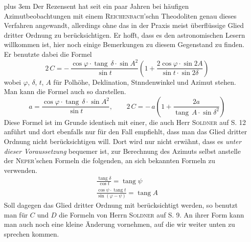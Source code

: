 \begingroup\rightskip=0pt plus 3em
Der Rezensent hat seit ein paar Jahren bei häufigen Azimutbeobachtungen mit einem \textsc{Reichenbach}'schn Theodoliten genau dieses Verfahren angewandt, allerdings ohne das in der Praxis meist überflüssige Glied dritter Ordnung zu berücksichtigen. Er hofft, dass es den astronomischen Lesern willkommen ist, hier noch einige Bemerkungen zu diesem Gegenstand zu finden. Er benutzte dabei die Formel
\[
2\,C = -\,\frac{\cos\varphi\cdot \operatorname{tang}\,\delta\cdot \sin A^2}{\sin t}
\left(1 + \frac{2\cos\varphi\cdot \sin 2A}{\sin t\cdot \sin 2\delta}\right)
\]
wobei $\varphi$, $\delta$, $t$, $A$ für Polhöhe, Deklination, Stnndenwinkel und Azimut stehen. Man kann die Formel auch so darstellen.
\[
a = \frac{\cos\varphi\cdot \operatorname{tang}\,\delta\cdot \sin A^2}{\sin t}, \qquad
2\,C = -\,a\left(1 + \frac{2a}{\operatorname{tang}\,A\cdot \sin\delta^2}\right)
\]
Diese Formel ist im Grunde identisch mit einer, die auch Herr \textsc{Soldner} auf S. 12 anführt und dort ebenfalls nur für den Fall empfiehlt, dass man das Glied dritter Ordnung nicht berücksichtigen will. Dort wird nur nicht erwähnt, dass es \emph{unter dieser Voraussetzung} bequemer ist, zur Berechnung des Azimuts selbst anstelle der \textsc{Neper}'schen Formeln die folgenden, an sich bekannten Formeln zu verwenden.
\[
\begin{gathered}
\frac{\operatorname{tang}\delta}{\cos t}=\operatorname{tang}\psi\\[5pt]
\frac{\cos\psi\cdot\operatorname{tang}t}{\sin(\varphi-\psi)}=\operatorname{tang}A
\end{gathered}
\]
Soll dagegen das Glied dritter Ordnung mit berücksichtigt werden, so benutzt man für $C$ und $D$ die Formeln von Herrn \textsc{Soldner} auf S. 9. An ihrer Form kann man auch noch eine kleine Änderung vornehmen, auf die wir weiter unten zu sprechen kommen.\par\endgroup


